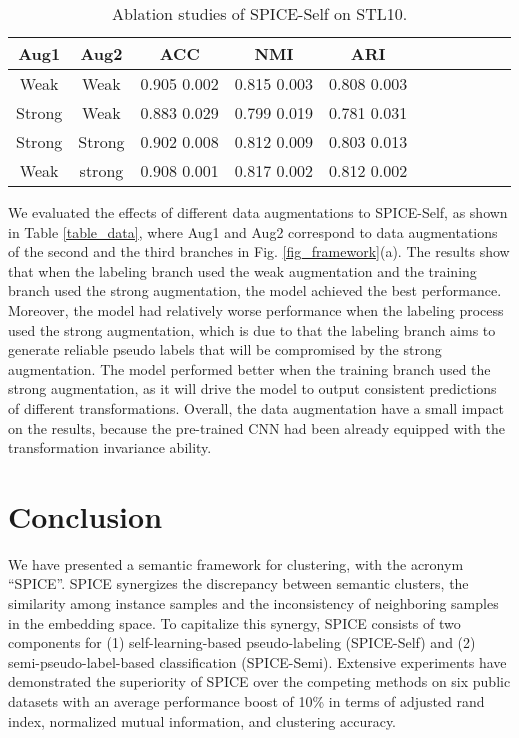 \documentclass[10pt,twocolumn,letterpaper]{article}
\begin{document}
\begin{table}[ht]
\footnotesize
\renewcommand\tabcolsep{5.3pt}
\caption{ Ablation studies of SPICE-Self on STL10.}
\label{table_results_abl}
\centering
\begin{tabular}{|cc|ccc|ccc|ccc|}

\hline

Aug1 & Aug2                          & ACC&NMI&ARI\\

\hline\hline
Weak   & Weak                         & 0.905  0.002 & 0.815  0.003 & 0.808  0.003     \\
Strong & Weak                         & 0.883  0.029 & 0.799  0.019 & 0.781  0.031     \\
Strong & Strong                       & 0.902  0.008 & 0.812  0.009 & 0.803  0.013     \\
Weak   & strong                       & 0.908  0.001 & 0.817  0.002 & 0.812  0.002     \\
\hline
\end{tabular}
\end{table}

We evaluated the effects of different data augmentations to SPICE-Self, as shown in Table \ref{table_data}, where Aug1 and Aug2 correspond to data augmentations of the second and the third branches in Fig. \ref{fig_framework}(a). The results show that when the labeling branch used the weak augmentation and the training branch used the strong augmentation, the model achieved the best performance. Moreover, the model had relatively worse performance when the labeling process used the strong augmentation, which is due to that the labeling branch aims to generate reliable pseudo labels that will be compromised by the strong augmentation.
The model performed better when the training branch used the strong augmentation, as it will drive the model to output consistent predictions of different transformations.
Overall, the data augmentation have a small impact on the results, because the pre-trained CNN had been already equipped with the transformation invariance ability.

\section{Conclusion}
We have presented a semantic framework for clustering, with the acronym ``SPICE''. SPICE  synergizes the discrepancy between semantic clusters, the similarity among instance samples and the inconsistency of neighboring samples in the embedding space.
To capitalize this synergy, SPICE consists of two components for (1) self-learning-based pseudo-labeling (SPICE-Self) and (2) semi-pseudo-label-based classification (SPICE-Semi).
Extensive experiments have demonstrated the superiority of SPICE over the competing methods on six public datasets with an average performance boost of 10\% in terms of adjusted rand index, normalized mutual information, and clustering accuracy.


{\small


}
\end{document}
